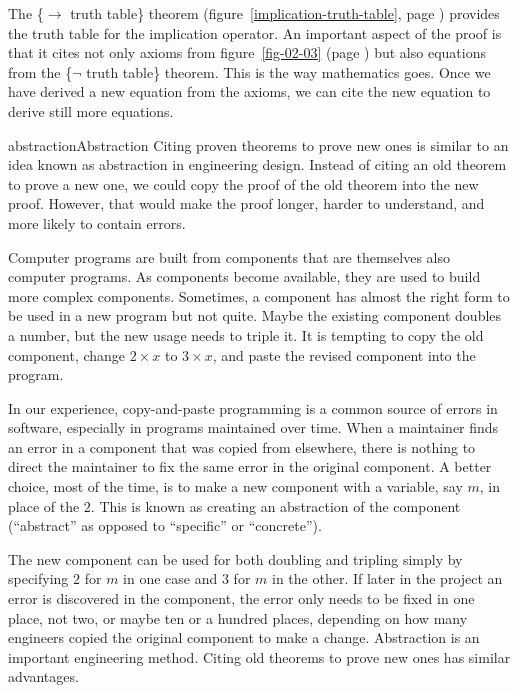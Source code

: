 The \{$\rightarrow$ truth table\} theorem
(figure~\ref{implication-truth-table}, page \pageref{implication-truth-table})
provides the truth table
for the implication operator.
An important aspect of the proof is that it cites
not only axioms from figure~\ref{fig-02-03} (page \pageref{fig-02-03})
but also equations from the \{$\neg$ truth table\} theorem.
This is the way mathematics goes. Once we have derived
a new equation from the axioms, we can cite
the new equation to derive still more equations.

\begin{aside}{abstraction}{Abstraction}
Citing proven theorems to prove new ones
is similar to an idea known as
abstraction
in engineering design.
Instead of citing an old theorem to prove a new one,
we could copy the proof of the old theorem into the new proof.
However, that would make the proof longer, harder to understand,
and more likely to contain errors.

Computer programs are built from components that are themselves
also computer programs. As components become available,
they are used to build more complex components.
Sometimes, a component has almost the right form
to be used in a new program but not quite.
Maybe the existing component doubles a number,
but the new usage needs to triple it.
It is tempting to copy the
old component, change $2 \times x$ to $3 \times x$,
and paste the revised component into the program.

In our experience, copy-and-paste
programming is a common source of errors in software,
especially in programs maintained
over time. When a maintainer finds an error in
a component that was copied from elsewhere,
there is nothing to direct the maintainer to fix
the same error in the original component.
A better choice, most of the time,
is to make a new component with
a variable, say $m$, in place of the $2$.
This is known as creating an abstraction of the component
(``abstract'' as opposed to ``specific'' or ``concrete'').

The new component can be used for both doubling and tripling
simply by specifying $2$ for $m$ in one case and $3$ for $m$ in the other.
If later in the project an error is discovered in the component,
the error only needs to be fixed in one place, not two,
or maybe ten or a hundred places, depending on how many engineers
copied the original component to make a change.
Abstraction is an important engineering method.
Citing old theorems to prove new ones has similar advantages.
\end{aside}

